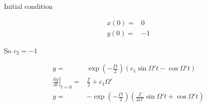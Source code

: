 \documentclass[10pt,fleqn]{article}
\newcommand{\ud}{\mathrm{d}}
\newcommand{\eqar}[1]
{
  \begin{align*}
    #1
  \end{align*}
}
\newcommand{\paren}[1]{{\left({#1}\right)}}
\newcommand{\diff}[3][{}]{{\frac{\ud^{#1} {#2}}{\ud {#3}{}^{#1}}}}
\begin{document}
Initial condition
\eqar{
  x\paren{0}=&0\\
  y\paren{0}=&-1
}
So $c_2=-1$
\eqar{
  y=&\exp\paren{-\frac{\Gamma t}{2}}\paren{c_1\sin\Omega't-\cos\Omega't}\\
  \left.\diff{y}{t}\right|_{t=0}=&\frac{\Gamma}{2}+c_1\Omega'\\
  y=&-\exp\paren{-\frac{\Gamma t}{2}}\paren{\frac{\Gamma}{2\Omega'}\sin\Omega't+\cos\Omega't}\\
}
\end{document}
